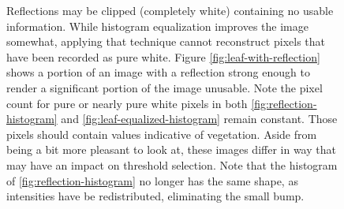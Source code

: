 \documentclass[letterpaper]{article}
\begin{document}
{{%
\begin{figure}[H]
	\centering
	\hfill
	\hfill
	\hfill
	\caption[Reflection problems in segmented vegetation]{Reflections may be clipped (completely white) containing no usable information. While histogram equalization improves the image somewhat, applying that technique cannot reconstruct pixels that have been recorded as pure white. Figure \ref{fig:leaf-with-reflection} shows a portion of an image with a reflection strong enough to render a significant portion of the image unusable. Note the pixel count for pure or nearly pure white pixels in both \ref{fig:reflection-histogram} and \ref{fig:leaf-equalized-histogram} remain constant.  Those pixels should contain values indicative of vegetation. Aside from being a bit more pleasant to look at, these images differ in way that may have an impact on threshold selection. Note that the histogram of \ref{fig:reflection-histogram} no longer has the same shape, as intensities have be redistributed, eliminating the small bump.}
	\label{fig:reflection}
\end{figure}

}}
\end{document}
